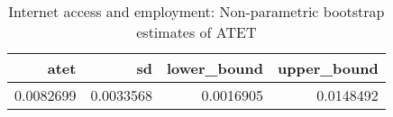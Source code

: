 \begin{table}[!h]
\centering
\caption{\label{tab:tab:np_atet}Internet access and employment: Non-parametric bootstrap estimates of ATET}
\centering
\begin{tabular}[t]{rrrr}
\toprule
atet & sd & lower\_bound & upper\_bound\\
\midrule
0.0082699 & 0.0033568 & 0.0016905 & 0.0148492\\
\bottomrule
\end{tabular}
\end{table}
